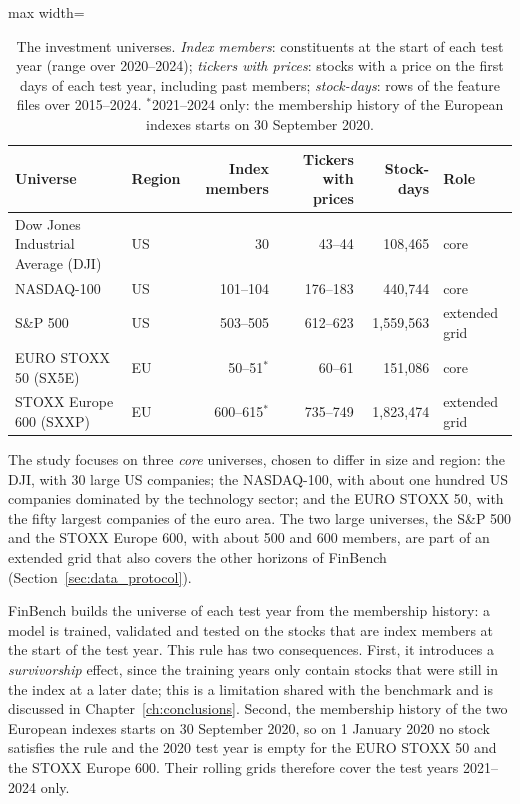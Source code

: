\begin{table}[htbp]
    \centering
    \footnotesize
    \begin{adjustbox}{max width=\textwidth}
    \begin{tabular}{@{}llrrrl@{}}
        \toprule
        \textbf{Universe} & \textbf{Region} & \textbf{Index members} & \textbf{Tickers with prices} & \textbf{Stock-days} & \textbf{Role} \\
        \midrule
        Dow Jones Industrial Average (DJI) & US & 30 & 43--44 & 108{,}465 & core \\
        NASDAQ-100 & US & 101--104 & 176--183 & 440{,}744 & core \\
        S\&P 500 & US & 503--505 & 612--623 & 1{,}559{,}563 & extended grid \\
        EURO STOXX 50 (SX5E) & EU & 50--51$^\ast$ & 60--61 & 151{,}086 & core \\
        STOXX Europe 600 (SXXP) & EU & 600--615$^\ast$ & 735--749 & 1{,}823{,}474 & extended grid \\
        \bottomrule
    \end{tabular}
    \end{adjustbox}
    \caption{The investment universes. \emph{Index members}: constituents at the start of each test year (range over 2020--2024); \emph{tickers with prices}: stocks with a price on the first days of each test year, including past members; \emph{stock-days}: rows of the feature files over 2015--2024. $^\ast$2021--2024 only: the membership history of the European indexes starts on 30 September 2020.}
    \label{tab:data_universes}
\end{table}

The study focuses on three \emph{core} universes, chosen to differ in size and region: the DJI, with 30 large US companies; the NASDAQ-100, with about one hundred US companies dominated by the technology sector; and the EURO STOXX 50, with the fifty largest companies of the euro area. The two large universes, the S\&P 500 and the STOXX Europe 600, with about 500 and 600 members, are part of an extended grid that also covers the other horizons of FinBench (Section~\ref{sec:data_protocol}).

FinBench builds the universe of each test year from the membership history: a model is trained, validated and tested on the stocks that are index members at the start of the test year. This rule has two consequences. First, it introduces a \emph{survivorship} effect, since the training years only contain stocks that were still in the index at a later date; this is a limitation shared with the benchmark and is discussed in Chapter~\ref{ch:conclusions}. Second, the membership history of the two European indexes starts on 30 September 2020, so on 1 January 2020 no stock satisfies the rule and the 2020 test year is empty for the EURO STOXX 50 and the STOXX Europe 600. Their rolling grids therefore cover the test years 2021--2024 only.

